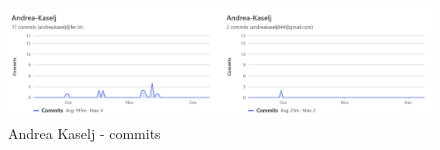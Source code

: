 		\begin{figure}[H]
				\includegraphics[scale=0.50]{slike/commits_andrea_kaselj.png} %
				
				\centering
				\caption{Andrea Kaselj - commits}
				\label{fig:Andrea Kaselj commits}
				\end{figure}
	   
			
		
	
			
		
	